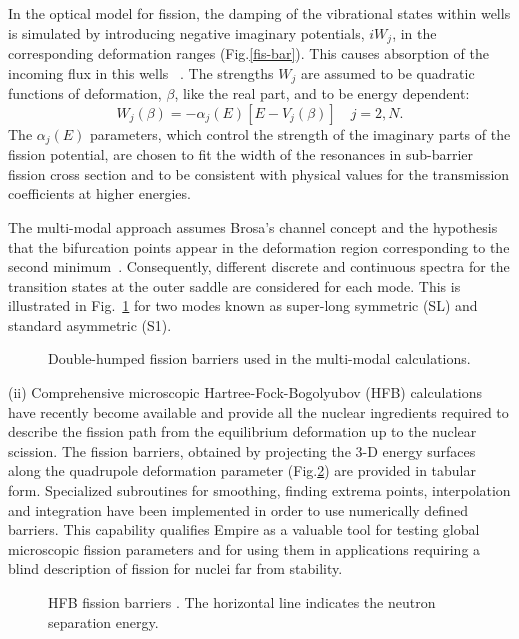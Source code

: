 \documentclass[twocolumn,amsmath,amssymb,10pt,groupedaddress,letter]{revtex4}
\begin{document}
In the optical model for fission, the damping of the vibrational states within wells is
simulated by introducing negative imaginary potentials, $iW_j$, in the corresponding
deformation ranges (Fig.\ref{fis-bar}).
This causes absorption of the incoming flux in this wells
~\cite{Bjornholm:80, Bhandari:79, Back:74}. The strengths $W_j$ are assumed to be
quadratic functions of
deformation, $\beta$, like the real part,  and to be energy dependent$:$
%
\begin{equation}
W_j(\beta)=-\alpha_j(E)[E-V_j(\beta)]\quad j=2,N.
\end{equation}
%
The $\alpha_j(E)$ parameters, which control the strength of the imaginary parts
of the fission potential, are chosen to fit the width of the resonances
in sub-barrier fission cross section and to be consistent with physical values
for the transmission coefficients at higher energies.

The multi-modal approach assumes Brosa's channel concept and the hypothesis that the
bifurcation points appear in the deformation region corresponding to the second
minimum~\cite{Brosa:90-multimodal}. Consequently, different discrete and continuous spectra
for the transition states at the outer saddle are considered for each
mode. This is illustrated in Fig.~\ref{fis-multimod}
for two modes known as super-long symmetric (SL) and standard asymmetric
(S1).

%
\begin{figure}[htbp]
\caption{Double-humped fission barriers used in the multi-modal calculations.}
\label{fis-multimod}
\end{figure}
%

(ii)
Comprehensive microscopic Hartree-Fock-Bogolyubov (HFB) calculations \cite{Goriely:07-mass}
have recently become available and provide all the nuclear ingredients required to
describe the fission path from the equilibrium deformation up to the nuclear scission.
The fission barriers, obtained by projecting the 3-D energy surfaces along the quadrupole
deformation parameter (Fig.\ref{fis-tot-bar}) are provided in tabular form. Specialized subroutines for smoothing,
finding extrema points, interpolation and integration have been implemented in order
to use numerically defined barriers. This capability qualifies Empire as a valuable tool for
testing global microscopic fission parameters and for using them in applications
requiring a blind description of fission for nuclei far from stability.
%
\begin{figure}[htbp]
\caption{HFB fission barriers \cite{Goriely:07-mass}. The horizontal line indicates the neutron separation energy.}
\label{fis-tot-bar}
\end{figure}
%
\medskip
\end{document}
